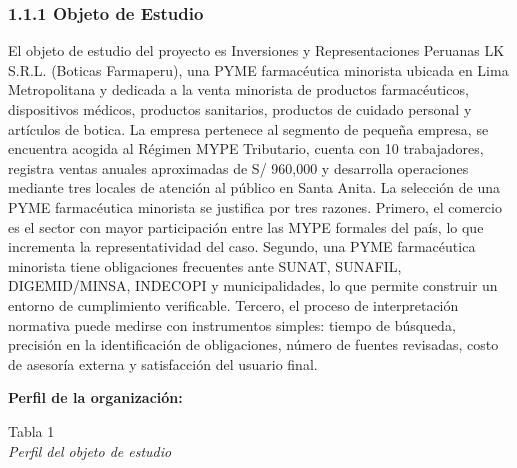 \documentclass[12pt,a4paper,oneside]{report}
\begin{document}
\subsubsection{1.1.1 Objeto de Estudio}\label{objeto-de-estudio}

El objeto de estudio del proyecto es Inversiones y Representaciones
Peruanas LK S.R.L. (Boticas Farmaperu), una PYME farmacéutica minorista
ubicada en Lima Metropolitana y dedicada a la venta minorista de
productos farmacéuticos, dispositivos médicos, productos sanitarios,
productos de cuidado personal y artículos de botica. La empresa
pertenece al segmento de pequeña empresa, se encuentra acogida al
Régimen MYPE Tributario, cuenta con 10 trabajadores, registra ventas
anuales aproximadas de S/ 960,000 y desarrolla operaciones mediante tres
locales de atención al público en Santa Anita. La selección de una PYME
farmacéutica minorista se justifica por tres razones. Primero, el
comercio es el sector con mayor participación entre las MYPE formales
del país, lo que incrementa la representatividad del caso. Segundo, una
PYME farmacéutica minorista tiene obligaciones frecuentes ante SUNAT,
SUNAFIL, DIGEMID/MINSA, INDECOPI y municipalidades, lo que permite
construir un entorno de cumplimiento verificable. Tercero, el proceso de
interpretación normativa puede medirse con instrumentos simples: tiempo
de búsqueda, precisión en la identificación de obligaciones, número de
fuentes revisadas, costo de asesoría externa y satisfacción del usuario
final.

\textbf{Perfil de la organización:}

\label{_Toc231672256}{}Tabla 1\\
\emph{Perfil del objeto de estudio}
\end{document}
